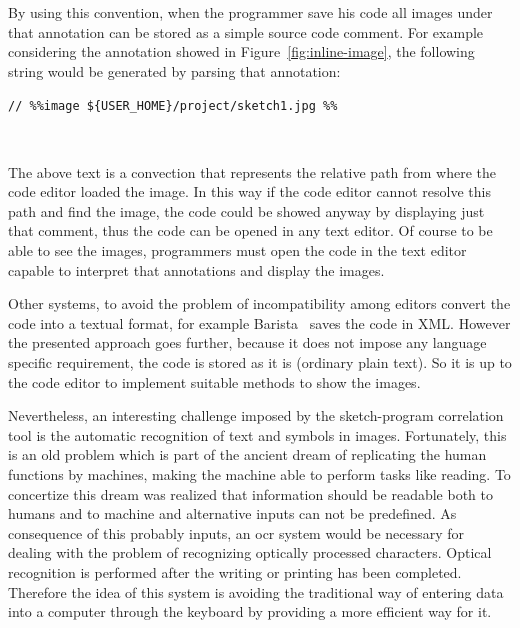 By using this convention, when the programmer save his code all images under that annotation can be stored as a simple source code comment. For example considering the annotation showed in Figure~\ref{fig:inline-image}, the following string would be generated by parsing that annotation:

\begin{center}
\begin{minipage}[c]{.6\textwidth}
\texttt{// \%\%image \$\{USER\_HOME\}/project/sketch1.jpg \%\%}
\end{minipage} \\
\end{center}

The above text is a convection that represents the relative path from where the code editor loaded the image. In this way if the code editor cannot resolve this path and find the image, the code could be showed anyway by displaying just that comment, thus the code can be opened in any text editor. Of course to be able to see the images, programmers must open the code in the text editor capable to interpret that annotations and display the images. 

Other systems, to avoid the problem of incompatibility among editors convert the code into a textual format, for example Barista~\citep{ko2006barista} saves the code in XML. However the presented approach goes further, because it does not impose any language specific requirement, the code is stored as it is (ordinary plain text). So it is up to the code editor to implement suitable methods to show the images.

Nevertheless, an interesting challenge imposed by the sketch-program correlation tool is the automatic recognition of text and symbols in images. Fortunately, this is an old problem which is part of the ancient dream of replicating the human functions by machines, making the machine able to perform tasks like reading. To concertize this dream was realized that information should be readable both to humans and to machine and alternative inputs can not be predefined. As consequence of this probably inputs, an \gls{ocr} system would be necessary for dealing with the problem of recognizing optically processed characters. Optical recognition is performed after the writing or printing has been completed. Therefore the idea of this system is avoiding the traditional way of entering data into a computer through the keyboard by providing a more efficient way for it.


